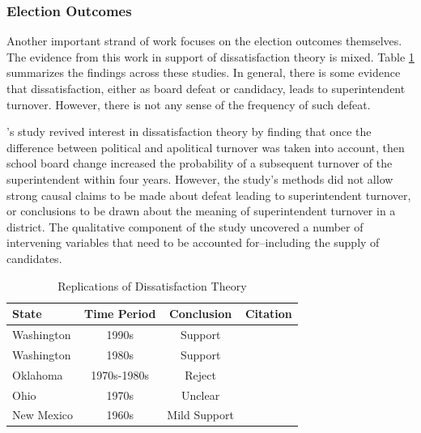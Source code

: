 \subsubsection{Election Outcomes}
Another important strand of work focuses on the election outcomes themselves. 
The evidence from this work in support of dissatisfaction theory is mixed. Table 
\ref{tab:dtheoryrep} summarizes the findings across these studies. In general, 
there is some evidence that dissatisfaction, either as board defeat or candidacy, 
leads to superintendent turnover. However, there is not any sense of the frequency 
of such defeat. 

\citet{RefWorks:311}'s study revived interest in dissatisfaction theory by finding 
that once the difference between political and apolitical turnover was taken into 
account, then school board change increased the probability of a subsequent 
turnover of the superintendent within four years. However, the study's methods 
did not allow strong causal claims to be made about defeat leading to superintendent 
turnover, or conclusions to be drawn about the meaning of superintendent turnover 
in a district. The qualitative component of the study uncovered a number of intervening 
variables that need to be accounted for--including the supply of candidates.


\begin{table}[h!]
\begin{center}
\begin{small}
\caption{Replications of Dissatisfaction Theory}
\label{tab:dtheoryrep}
\begin{tabular}{| l | c | c | c |}
\hline
\textbf{State}  & \textbf{Time Period} & \textbf{Conclusion} & \textbf{Citation} \\ \hline
Washington  & 1990s & Support & \citet{RefWorks:311} \\ \hline
Washington & 1980s & Support & \citet{RefWorks:245} \\ \hline
Oklahoma & 1970s-1980s & Reject & \citet{RefWorks:247} \\ \hline
Ohio & 1970s & Unclear &  \citet{RefWorks:259,RefWorks:337} \\ \hline
New Mexico & 1960s & Mild Support & \citet{RefWorks:341} \\ \hline
\end{tabular}
\end{small}
\end{center}
\end{table}


